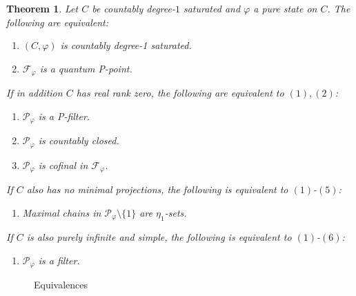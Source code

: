 \documentclass[10pt]{amsart}
\newtheorem{thm}{Theorem}[section]
\theoremstyle{definition}
\newcommand{\Fp}{\mathscr{F}_\varphi}
\newcommand{\Pp}{\mathscr{P}_\varphi}
\begin{document}
\begin{thm}\label{satequiv}
    Let $C$ be countably degree-$1$ saturated and $\varphi$ a pure state on $C$. The following are equivalent:
    \begin{enumerate}
        \item $(C,\varphi)$ is countably degree-1 saturated.
        \item $\Fp$ is a quantum P-point.
    \end{enumerate}
    If in addition $C$ has real rank zero, the following are equivalent to $(1),(2)$:
    \begin{enumerate}[resume]
        \item $\Pp$ is a P-filter.
        \item $\Pp$ is countably closed.
        \item $\Pp$ is cofinal in $\Fp$.
    \end{enumerate}
    If $C$ also has no minimal projections, the following is equivalent to $(1)$-$(5)$:
    \begin{enumerate}[resume]
        \item Maximal chains in $\Pp\setminus\{1\}$ are $\eta_1$-sets.
    \end{enumerate}
    If $C$ is also purely infinite and simple, the following is equivalent to $(1)$-$(6)$:
    \begin{enumerate}[resume]
        \item $\Pp$ is a filter.
    \end{enumerate}
\end{thm}

\begin{figure}[h]
        \centering
        \caption{Equivalences}
        \label{equiv}
    \end{figure}
\end{document}
